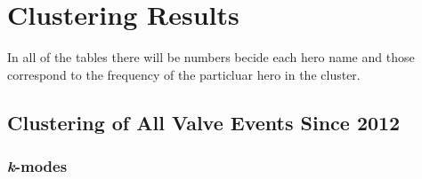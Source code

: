 \documentclass[result.tex]{subfiles}
\begin{document}
\clearpage
\appendix

\section*{Clustering Results}

In all of the tables there will be numbers becide each hero name and those correspond to the frequency of the particluar hero in the cluster.

\subsection*{Clustering of All Valve Events Since 2012}

\subsubsection*{\textit{k}-modes}
\end{document}
